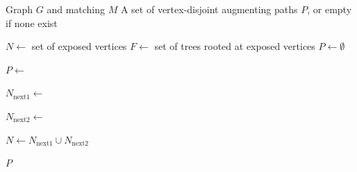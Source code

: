 \begin{algorithm}[!htbp]
  \footnotesize
  \captionsetup{font = footnotesize}
  \caption{Parallel Augmenting-Path Search Procedure in X-Blossom}
  \label{Algo:XBlossom}
  \begin{algorithmic}[1]

  \Require Graph $G$ and matching $M$
  \Ensure A set of vertex-disjoint augmenting paths $P$, or empty if none exist

  \State $N \gets$ set of exposed vertices
  \State $F \gets$ set of trees rooted at exposed vertices
  \State $P \gets \emptyset$


      \State $P \gets$ 

      \State $N_{\text{next1}} \gets$ 

      \State $N_{\text{next2}} \gets$ 
      
      \State $N \gets N_{\text{next1}} \cup N_{\text{next2}}$

  \EndWhile
  
  \State \Return $P$

  \end{algorithmic}
\end{algorithm}
\vspace{-4pt}
